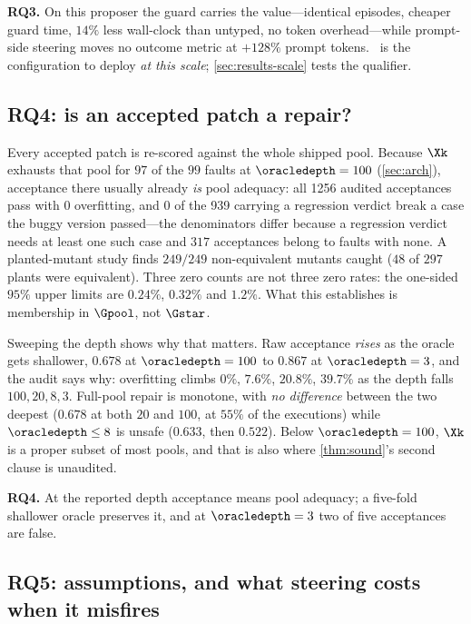 \ifsuppmatter\else\fi
\ifsuppmatter\else\fi
\ifsuppmatter\else\fi

\textbf{RQ3.} On this proposer the guard carries the value---identical
episodes, cheaper guard time, $14\%$ less wall-clock than untyped, no token
overhead---while prompt-side steering moves no outcome metric at $+128\%$
prompt tokens. \armguard\ is the configuration to deploy \emph{at this scale};
\cref{sec:results-scale} tests the qualifier.

\subsection{RQ4: is an accepted patch a repair?}
\label{sec:results-depth}

Every accepted patch is re-scored against the whole shipped pool. Because $\Xk$
exhausts that pool for $97$ of the $99$ faults at $\oracledepth = 100$
(\cref{sec:arch}), acceptance there usually already \emph{is} pool adequacy:
all \num{1256} audited acceptances pass with $0$ overfitting, and $0$ of the
\num{939} carrying a regression verdict break a
case the buggy version passed---the denominators differ because a regression
verdict needs at least one such case and $317$ acceptances belong to faults
with none. A planted-mutant study finds $249/249$ non-equivalent mutants caught
($48$ of $297$ plants were equivalent). Three zero counts are not three zero
rates: the one-sided $95\%$ upper limits are $0.24\%$, $0.32\%$ and $1.2\%$.
What this establishes is membership in $\Gpool$, not $\Gstar$.

Sweeping the depth shows why that matters. Raw acceptance \emph{rises} as the
oracle gets shallower, $0.678$ at $\oracledepth = 100$ to $0.867$ at
$\oracledepth = 3$, and the audit says why: overfitting climbs $0\%$, $7.6\%$,
$20.8\%$, $39.7\%$ as the depth falls $100, 20, 8, 3$. Full-pool repair is
monotone, with \emph{no difference} between the two deepest ($0.678$ at both
$20$ and $100$, at $55\%$ of the executions) while $\oracledepth \le 8$ is
unsafe ($0.633$, then $0.522$). Below $\oracledepth = 100$, $\Xk$ is a proper
subset of most pools, and that is also where \cref{thm:sound}'s second clause
is unaudited.

\textbf{RQ4.} At the reported depth acceptance means pool adequacy; a five-fold
shallower oracle preserves it, and at $\oracledepth = 3$ two of five
acceptances are false.

\subsection{RQ5: assumptions, and what steering costs when it misfires}
\label{sec:results-assumptions}


